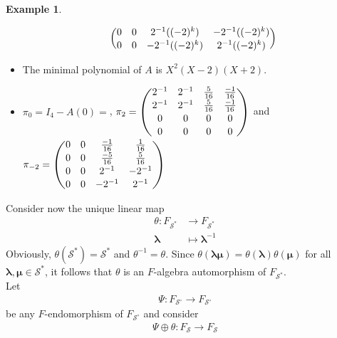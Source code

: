 \documentclass[12pt]{amsart}
\theoremstyle{definition}
\newtheorem{example}[thrm]{Example}
\numberwithin{equation}{section}
\numberwithin{equation}{section}
\begin{document}
\begin{example}
\begin{itemize}
$$\begin{pmatrix}
0&0&2^{-1}((-2)^{k})&-2^{-1}((-2)^{k})\vspace*{0.1pc}\\
0&0&-2^{-1}((-2)^{k})&2^{-1}((-2)^{k})
\end{pmatrix}$$
\item The minimal polynomial of $A$ is $X^{2}(X-2)(X+2)$.
\item $\pi_{0}=I_{4}-A(0)=$,
$\pi_{2}=\begin{pmatrix}
2^{-1}&2^{-1}&\frac{5}{16}&\frac{-1}{16}\vspace*{0.1pc}\\
2^{-1}&2^{-1}&\frac{5}{16}&\frac{-1}{16}\vspace*{0.1pc}\\
0&0&0&0\vspace*{0.1pc}\\
0&0&0&0
\end{pmatrix}$ and $\pi_{-2}=\begin{pmatrix}
0&0&\frac{-1}{16}&\frac{1}{16}\vspace*{0.1pc}\\
0&0&\frac{-5}{16}&\frac{5}{16}\vspace*{0.1pc}\\
0&0&2^{-1}&-2^{-1}\vspace*{0.1pc}\\
0&0&-2^{-1}&2^{-1}
\end{pmatrix}$
\end{itemize}
\end{example}
Consider now the unique linear map
\begin{align*}
\theta: F_{\mathcal{S}^{\ast}} &\longrightarrow F_{\mathcal{S}^{\ast}}\\
\pmb{\lambda} &\longmapsto \pmb{\lambda}^{-1}
\end{align*}
Obviously, $\theta(\mathcal{S}^{\ast})=\mathcal{S}^{\ast}$ and $\theta^{-1}=\theta$. Since $\theta(\pmb{\lambda}\pmb{\mu})=\theta(\pmb{\lambda})\theta(\pmb{\mu})$ for all $\pmb{\lambda}, \pmb{\mu}\in \mathcal{S}^{\ast}$, it follows that $\theta$ is an $F$-algebra automorphism of $F_{\mathcal{S}^{\ast}}$.
\\Let \begin{align*}
\Psi: F_{\mathcal{S}^{\circ}} \longrightarrow F_{\mathcal{S}^{\circ}}
\end{align*}
be any $F$-endomorphism of $F_{\mathcal{S}^{\circ}}$ and consider
\begin{align*}
\Psi\oplus \theta: F_{\mathcal{S}} \longrightarrow F_{\mathcal{S}}
\end{align*}
\end{document}
